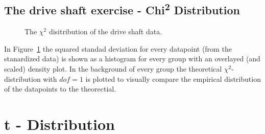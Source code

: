\documentclass[
  a4paper,
]{scrbook}
\begin{document}
\subsection{\texorpdfstring{The drive shaft exercise -
Chi\textsuperscript{2}
Distribution}{The drive shaft exercise - Chi2 Distribution}}\label{the-drive-shaft-exercise---chi2-distribution}

\begin{figure}[ht]


\caption{\label{fig-ds-chi}The \(\chi^2\) disitribution of the drive
shaft data.}

\end{figure}%

In Figure~\ref{fig-ds-chi} the squared standad deviation for every
datapoint (from the stanardized data) is shown as a histogram for every
group with an overlayed (and scaled) density plot. In the background of
every group the theoretical \(\chi^2\)-distribution with \(dof = 1\) is
plotted to visually compare the empirical distribution of the datapoints
to the theorectial.

\section{t - Distribution}\label{t---distribution}
\end{document}
